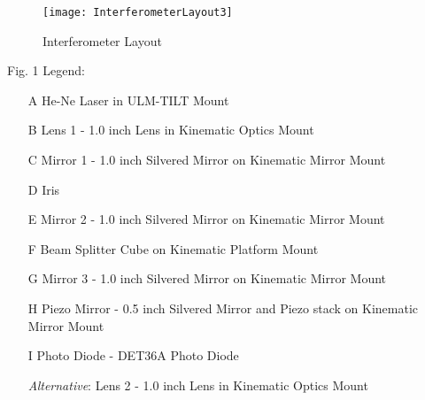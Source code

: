 \begin{figure}[ht]
\centering
\texttt{[image: InterferometerLayout3]}
\caption{Interferometer Layout}
\label{fig:interferometer}
\end{figure}
\newpage
Fig. 1 Legend:
\begin{enumerate} \itemsep1pt \parskip0pt 
   \item[A] He-Ne Laser in ULM-TILT Mount
   \item[B] Lens 1 - 1.0 inch Lens in Kinematic Optics Mount
   \item[C] Mirror 1 - 1.0 inch Silvered Mirror on Kinematic Mirror Mount
   \item[D] Iris
   \item[E] Mirror 2 - 1.0 inch Silvered Mirror on Kinematic Mirror Mount
   \item[F] Beam Splitter Cube on Kinematic Platform Mount
   \item[G] Mirror 3 - 1.0 inch Silvered Mirror on Kinematic Mirror Mount
   \item[H] Piezo Mirror - 0.5 inch Silvered Mirror and Piezo stack on Kinematic Mirror Mount
   \item[I] Photo Diode - DET36A Photo Diode

    \emph{Alternative}: Lens 2 - 1.0 inch Lens in Kinematic Optics Mount
\end{enumerate}
